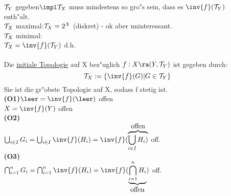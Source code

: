 \begin{minipage}[l]{7.2cm}
$\mathcal T_Y$ gegeben$\impl\T_X$ muss mindestens so gro"s sein, dass es $\inv{f}(\T_Y)$ enth"alt.\vspace*{0.3cm}\\
$\mathcal T_X$ maximal:$\mathcal T_X = 2^X$ (diskret) - ok aber uninteressant.\vspace*{0.3cm}\\
$\mathcal T_X$ minimal:\\
$\T_X =\inv{f}(\T_Y)$ d.h.\\
\\
Die \ul{initiale Topologie} auf X bez"uglich $f:X\ra(Y,\T_Y)$ ist gegeben durch:\vspace*{-0.3cm}\\
$$\T_X:=\{\inv{f}(G)|G\in\T_Y\}$$
Sie ist die gr"obste Topologie auf X, sodass f stetig ist.\vspace*{0.3cm}\\
{\bf (O1)}$\leer =\inv{f}(\leer )$ offen\\
$X=\inv{f}(Y)$ offen\\
{\bf (O2)}\vspace*{-0.7cm}\\
{\small $\bigcup_{i\in I}G_i=\bigcup_{i\in I}\inv{f}(H_i)=\inv{f}(\overbrace{\bigcup_{i\in I} H_i)}^{\mbox{offen}}$ off.}\\
{\bf (O3)}\vspace*{-0.1cm}\\
{\small $\bigcap_{i=1}^nG_i=\bigcap_{i=1}^n\inv{f}(H_i)=\inv{f}(\underbrace{\bigcap_{i=1}^n H_i}_{\mbox{offen}})$ off.}
\end{minipage}\hspace*{0.5cm}
